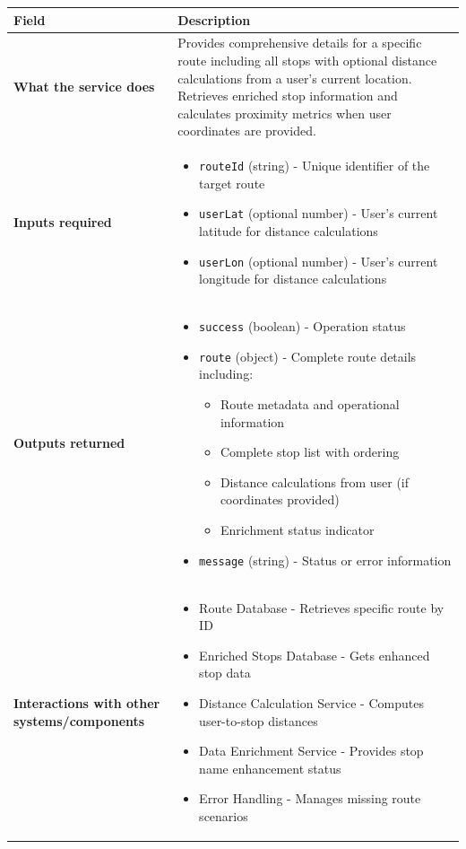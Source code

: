 \documentclass[11pt,a4paper]{article}
\begin{document}
\begin{longtable}{|p{3cm}|p{12cm}|}
\hline
\textbf{Field} & \textbf{Description} \\
\hline
\textbf{What the service does} & 
Provides comprehensive details for a specific route including all stops with optional distance calculations from a user's current location. Retrieves enriched stop information and calculates proximity metrics when user coordinates are provided. \\
\hline
\textbf{Inputs required} & 
\begin{itemize}[nosep]
\item \texttt{routeId} (string) - Unique identifier of the target route
\item \texttt{userLat} (optional number) - User's current latitude for distance calculations
\item \texttt{userLon} (optional number) - User's current longitude for distance calculations
\end{itemize} \\
\hline
\textbf{Outputs returned} & 
\begin{itemize}[nosep]
\item \texttt{success} (boolean) - Operation status
\item \texttt{route} (object) - Complete route details including:
  \begin{itemize}[nosep]
  \item Route metadata and operational information
  \item Complete stop list with ordering
  \item Distance calculations from user (if coordinates provided)
  \item Enrichment status indicator
  \end{itemize}
\item \texttt{message} (string) - Status or error information
\end{itemize} \\
\hline
\textbf{Interactions with other systems/components} & 
\begin{itemize}[nosep]
\item Route Database - Retrieves specific route by ID
\item Enriched Stops Database - Gets enhanced stop data
\item Distance Calculation Service - Computes user-to-stop distances
\item Data Enrichment Service - Provides stop name enhancement status
\item Error Handling - Manages missing route scenarios
\end{itemize} \\
\hline
\end{longtable}
\end{document}
